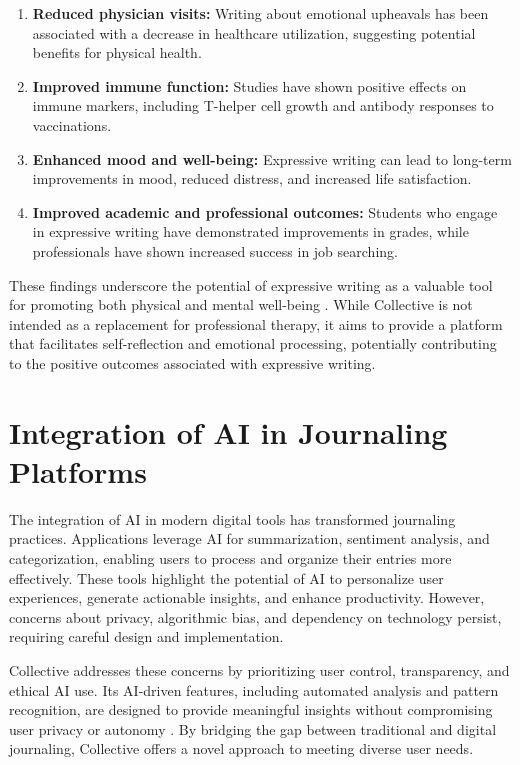 \begin{enumerate}
	\item \textbf{Reduced physician visits:} Writing about emotional upheavals has been associated with a decrease in healthcare utilization, suggesting potential benefits for physical health.
	
	\item \textbf{Improved immune function:} Studies have shown positive effects on immune markers, including T-helper cell growth and antibody responses to vaccinations.
	
	\item \textbf{Enhanced mood and well-being:} Expressive writing can lead to long-term improvements in mood, reduced distress, and increased life satisfaction.
	
	\item \textbf{Improved academic and professional outcomes:} Students who engage in expressive writing have demonstrated improvements in grades, while professionals have shown increased success in job searching.
\end{enumerate}

These findings underscore the potential of expressive writing as a valuable tool for promoting both physical and mental well-being \cite{pennebaker1999forming}. While Collective is not intended as a replacement for professional therapy, it aims to provide a platform that facilitates self-reflection and emotional processing, potentially contributing to the positive outcomes associated with expressive writing.

\section{Integration of AI in Journaling Platforms}\label{sec:ai-integration}

The integration of AI in modern digital tools has transformed journaling practices. Applications leverage AI for summarization, sentiment analysis, and categorization, enabling users to process and organize their entries more effectively. These tools highlight the potential of AI to personalize user experiences, generate actionable insights, and enhance productivity. However, concerns about privacy, algorithmic bias, and dependency on technology persist, requiring careful design and implementation.

Collective addresses these concerns by prioritizing user control, transparency, and ethical AI use. Its AI-driven features, including automated analysis and pattern recognition, are designed to provide meaningful insights without compromising user privacy or autonomy \cite{allahyari2017text}. By bridging the gap between traditional and digital journaling, Collective offers a novel approach to meeting diverse user needs.

